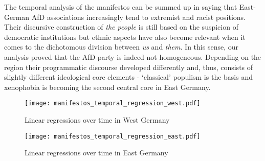 \documentclass[a4paper]{scrreprt}
\begin{document}
The temporal analysis of the manifestos can be summed up in saying that East-German AfD associations increasingly tend to extremist and racist positions. Their discursive construction of {\em the people} is still based on the suspicion of democratic institutions but ethnic aspects have also become relevant when it comes to the dichotomous division between {\em us} and {\em them}. In this sense, our analysis proved that the AfD party is indeed not homogeneous. Depending on the region their programmatic discourse developed differently and, thus, consists of slightly different ideological core elements - `classical' populism is the basis and xenophobia is becoming the second central core in East Germany.
\begin{figure}[ht]
    \centering
    \texttt{[image: manifestos\_temporal\_regression\_west.pdf]}
    \caption{Linear regressions over time in West Germany}
    \label{fig:fig7}
\end{figure}
\begin{figure}[ht]
    \centering
    \texttt{[image: manifestos\_temporal\_regression\_east.pdf]}
    \caption{Linear regressions over time in East Germany}
    \label{fig:fig8}
\end{figure}
\end{document}
